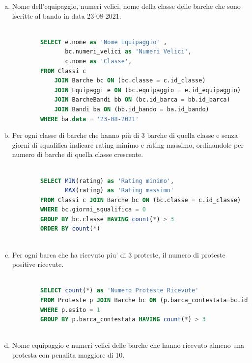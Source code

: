 \documentclass{article}
\begin{document}
\begin{enumerate}[a)]
    \item Nome dell'equipaggio, numeri velici, nome della classe delle barche che sono iscritte al bando in data 23-08-2021. 
    
    \lstset{style=bashstyle}
    \begin{lstlisting}[language=sql]
    
        SELECT e.nome as 'Nome Equipaggio' , 
               bc.numeri_velici as 'Numeri Velici', 
               c.nome as 'Classe', 
        FROM Classi c 
            JOIN Barche bc ON (bc.classe = c.id_classe) 
            JOIN Equipaggi e ON (bc.equipaggio = e.id_equipaggio) 
            JOIN BarcheBandi bb ON (bc.id_barca = bb.id_barca) 
            JOIN Bandi ba ON (bb.id_bando = ba.id_bando)
        WHERE ba.data = '23-08-2021'
    \end{lstlisting} 
    
    \item Per ogni classe di barche che hanno più di 3 barche di quella classe e senza giorni di squalifica indicare rating minimo e rating massimo, ordinandole per numero di barche di quella classe crescente.
    
    \lstset{style=bashstyle}
    \begin{lstlisting}[language=sql]
    
        SELECT MIN(rating) as 'Rating minimo',
               MAX(rating) as 'Rating massimo' 
        FROM Classi c JOIN Barche bc ON (bc.classe = c.id_classe) 
        WHERE bc.giorni_squalifica = 0
        GROUP BY bc.classe HAVING count(*) > 3
        ORDER BY count(*)
        
    \end{lstlisting} 
    
    \newpage
    \item Per ogni barca che ha ricevuto piu' di 3 proteste, il numero di proteste positive ricevute.
    
    \lstset{style=bashstyle}
    \begin{lstlisting}[language=sql]
    
        SELECT count(*) as 'Numero Proteste Ricevute'
        FROM Proteste p JOIN Barche bc ON (p.barca_contestata=bc.id_barca)
        WHERE p.esito = 1
        GROUP BY p.barca_contestata HAVING count(*) > 3
        
    \end{lstlisting}
    
    \item Nome equipaggio e numeri velici delle barche che hanno ricevuto almeno una protesta con penalita maggiore di 10.
    

\end{enumerate}
\end{document}
